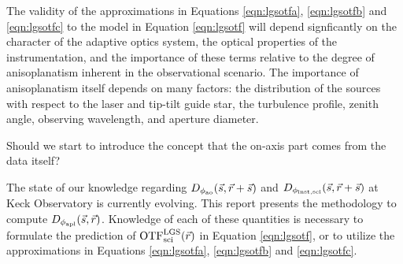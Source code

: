 The validity of the approximations in Equations \ref{eqn:lgsotfa},
\ref{eqn:lgsotfb} and \ref{eqn:lgsotfc} to the model in Equation \ref{eqn:lgsotf}
will depend signficantly on the character of the adaptive optics
system, the optical properties of the instrumentation, and the
importance of these terms relative to the degree of anisoplanatism
inherent in the observational scenario.  The importance of
anisoplanatism itself depends on many factors: the distribution of the
sources with respect to the laser and tip-tilt guide star, the
turbulence profile, zenith angle, observing wavelength, and aperture
diameter.  
\begin{notes}
Should we start to introduce the concept that the on-axis part
comes from the data itself? 
\end{notes}
The state of our knowledge regarding $D_{\rm
  \phi_{ao}}(\vec{s},\vec{r} + \vec{s})$ and
$D_{\rm \phi_{inst,sci}}(\vec{s},\vec{r} +
\vec{s})$ at Keck Observatory is currently evolving.  This
report presents the methodology to compute $D_{\rm
  \phi_{apl}}(\vec{s},\vec{r})$.  Knowledge of each of
these quantities is necessary to formulate the prediction of
${\rm OTF}^{\rm LGS}_{\rm sci}(\vec{r})$ in Equation \ref{eqn:lgsotf}, or to
utilize the approximations in Equations \ref{eqn:lgsotfa}, \ref{eqn:lgsotfb}
and \ref{eqn:lgsotfc}.

